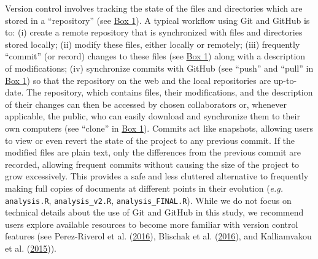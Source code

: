 Version control involves tracking the state of the files and directories which are stored in a ``repository'' (see \protect\hyperlink{definitions}{Box 1}).
A typical workflow using Git and GitHub is to: (i) create a remote repository that is synchronized with files and directories stored locally; (ii) modify these files, either locally or remotely; (iii) frequently ``commit'' (or record) changes to these files (see \protect\hyperlink{definitions}{Box 1}) along with a description of modifications; (iv) synchronize commits with GitHub (see ``push'' and ``pull'' in \protect\hyperlink{definitions}{Box 1}) so that the repository on the web and the local repositories are up-to-date.
The repository, which contains files, their modifications, and the description of their changes can then be accessed by chosen collaborators or, whenever applicable, the public, who can easily download and synchronize them to their own computers (see ``clone'' in \protect\hyperlink{definitions}{Box 1}).
Commits act like snapshots, allowing users to view or even revert the state of the project to any previous commit.
If the modified files are plain text, only the differences from the previous commit are recorded, allowing frequent commits without causing the size of the project to grow excessively.
This provides a safe and less cluttered alternative to frequently making full copies of documents at different points in their evolution (\emph{e.g.} \texttt{analysis.R}, \texttt{analysis\_v2.R}, \texttt{analysis\_FINAL.R}).
While we do not focus on technical details about the use of Git and GitHub in this study, we recommend users explore available resources to become more familiar with version control features (see Perez-Riverol et al. (\protect\hyperlink{ref-kEX5dgzK}{2016}), Blischak et al. (\protect\hyperlink{ref-PlcxShQU}{2016}), and Kalliamvakou et al. (\protect\hyperlink{ref-ndfO9H}{2015})).

